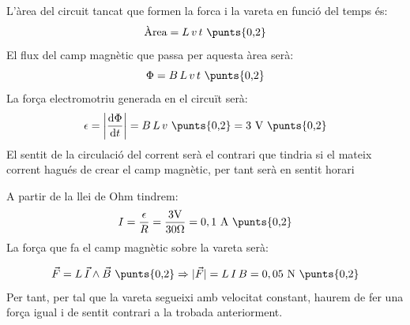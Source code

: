 \begin{solapartat}
L'àrea del circuit tancat que formen la forca i la vareta en funció del temps és:
\[ \text{Àrea} = L\,v\,t \ \text{\punts{0,2}} \]
El flux del camp magnètic que passa per aquesta àrea serà:
\[ \Phi = B\,L\,v\,t \ \text{\punts{0,2}} \]
La força electromotriu generada en el circuït serà:
\[ \epsilon = \left|\frac{\mathrm{d}\Phi}{\mathrm{d}t}\right| = B\,L\,v \ \text{\punts{0,2}} = 3\ \mathrm{V} \ \text{\punts{0,2}} \]
El sentit de la circulació del corrent serà el contrari que tindria si el mateix corrent hagués de crear el camp magnètic, per tant serà en sentit horari 
\end{solapartat}

\begin{solapartat}
A partir de la llei de Ohm tindrem:
\[ I = \frac{\epsilon}{R} = \frac{3\mathrm{V}}{30\Omega} = 0,1\ \mathrm{A} \ \text{\punts{0,2}} \]
La força que fa el camp magnètic sobre la vareta serà:


\[ \vec{F} = L\,\vec{I}\wedge\vec{B} \ \text{\punts{0,2}} \Rightarrow |\vec{F}| = L\,I\,B = 0,05\ \mathrm{N} \ \text{\punts{0,2}} \]
Per tant, per tal que la vareta segueixi amb velocitat constant, haurem de fer una força igual i de sentit contrari a la trobada anteriorment. 
\end{solapartat}
